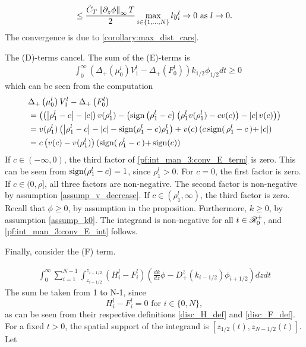 \begin{align}
	\leq  \frac{\Tilde{C}_T \left\lVert\partial_z \phi\right\rVert_\infty T}{2} \max_{i \in \{1,...,N\}} ly_i^l \rightarrow 0 \text{ as } l \rightarrow 0.\label{pf:int_man_3:conv_C_3}
\end{align}
The convergence is due to \eqref{corollary:max_dist_cars}. 

The (D)-terms cancel. 
The sum of the (E)-terms is
\begin{align}
	&\int_0^\infty \left(\Delta_+\left(\mu_0^l\right) V_1^l  - \Delta_+\left(F_0^l\right)\right)k_{1/2}\phi_{1/2} dt \geq 0 \label{pf:int_man_3:conv_E_int}
\end{align}
which can be seen from the computation
\begin{align}
	&\Delta_+\left(\mu_0^l\right) V_1^l - \Delta_+\left(F_0^l\right) \\
	&= \left(\left(\left|\rho^l_1 - c \right| -\left|c\right| \right) v(\rho^l_1)  - \left(\operatorname{sign}\left(\rho_1^l - c\right)\left(\rho_1^lv(\rho_1^l) - c v(c)\right) - \left|c\right| v(c)\right)\right) \\
	&=v(\rho^l_1)\left(\left|\rho^l_1 - c \right| - \left|c\right| - \operatorname{sign}(\rho^l_1 - c) \rho^l_1\right) + v(c)\left(c \operatorname{sign}\right(\rho^l_1 - c\left) + \left|c\right|\right) \\
	&=c\left(v(c)-v(\rho^l_1)\right)\left( \operatorname{sign}\right(\rho^l_1 - c\left) + \operatorname{sign}(c)\right) \label{pf:int_man_3:conv_E_term}
\end{align}
If $c \in (-\infty, 0)$, the third factor of \eqref{pf:int_man_3:conv_E_term} is zero. This can be seen from $\operatorname{sign}(\rho^l_1-c) = 1$, since $\rho^l_1 > 0$. For $c = 0$, the first factor is zero. 
If $c \in (0,\rho]$, all three factors are non-negative. The second factor is non-negative by assumption \eqref{assump_v_decrease}. If $c \in (\rho^l_1, \infty)$, the third factor is zero. Recall that $\phi \geq 0$, by assumption in the proposition. Furthermore, $k \geq 0$, by assumption \eqref{assump_k0}. The integrand is non-negative for all $t \in \mathscr{R}_0^+$, and \eqref{pf:int_man_3:conv_E_int} follows. 

Finally, consider the (F) term. 

\begin{align} 
	\int_0^\infty \sum_{i = 1}^{N-1}\int_{z_{i-1/2}}^{z_{i+1/2}} \left( H_i^l- F_i^l\right)\left(\frac{dk}{dz} \phi  - D_+^z(k_{i-1/2}) \phi_{i+1/2}\right) dz dt  
\end{align}
The sum be taken from 1 to N-1, since 
\begin{equation}
	H^l_i-F^l_i = 0 \text{ for } i \in \{0,N\}, 
\end{equation}
as can be seen from their respective definitions \eqref{disc_H_def} and \eqref{disc_F_def}. For a fixed $t > 0$,  the spatial support of the integrand is $[z_{1/2}(t), z_{N-1/2}(t)]$. Let 

